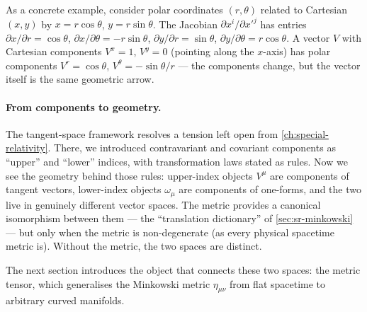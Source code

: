 As a concrete example, consider polar coordinates $(r, \theta)$ related to
Cartesian $(x, y)$ by $x = r\cos\theta$, $y = r\sin\theta$.  The Jacobian
$\partial x^i / \partial x'^j$ has entries $\partial x / \partial r =
\cos\theta$, $\partial x / \partial \theta = -r\sin\theta$,
$\partial y / \partial r = \sin\theta$,
$\partial y / \partial \theta = r\cos\theta$.  A vector $V$ with Cartesian
components $V^x = 1$, $V^y = 0$ (pointing along the $x$-axis) has polar
components $V^r = \cos\theta$, $V^\theta = -\sin\theta / r$ --- the components
change, but the vector itself is the same geometric arrow.

\paragraph{From components to geometry.}

The tangent-space framework resolves a tension left open from
\cref{ch:special-relativity}.  There, we introduced contravariant and
covariant components as ``upper'' and ``lower'' indices, with transformation
laws stated as rules.  Now we see the geometry behind those rules: upper-index
objects $V^\mu$ are components of tangent vectors, lower-index objects
$\omega_\mu$ are components of one-forms, and the two live in genuinely
different vector spaces.  The metric provides a canonical isomorphism between
them --- the ``translation dictionary'' of \cref{sec:sr-minkowski} --- but
only when the metric is non-degenerate (as every physical spacetime metric is).
Without the metric, the two spaces are distinct.

The next section introduces the object that connects these two spaces: the
metric tensor, which generalises the Minkowski metric $\eta_{\mu\nu}$ from
flat spacetime to arbitrary curved manifolds.
